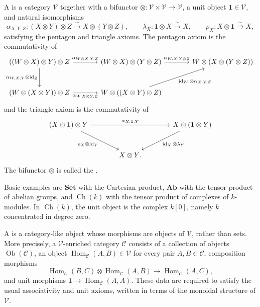 {A  is a category \(\mathcal V\) together with
a bifunctor \(\otimes:\mathcal V\times\mathcal V\to\mathcal V\), a unit
object \(\mathbf 1\in\mathcal V\), and natural isomorphisms
\[
\alpha_{X,Y,Z}:(X\otimes Y)\otimes Z\xrightarrow{\sim}X\otimes(Y\otimes Z),
\qquad
\lambda_X:\mathbf 1\otimes X\xrightarrow{\sim}X,
\qquad
\rho_X:X\otimes\mathbf 1\xrightarrow{\sim}X,
\]
satisfying the pentagon and triangle axioms.  The pentagon axiom is the
commutativity of
\[
\begin{tikzcd}[column sep=large, row sep=large]
{((W\otimes X)\otimes Y)\otimes Z}
    \arrow[r, "\alpha_{W\otimes X,Y,Z}"]
    \arrow[d, "\alpha_{W,X,Y}\otimes \operatorname{id}_Z"']
&
{(W\otimes X)\otimes (Y\otimes Z)}
    \arrow[r, "\alpha_{W,X,Y\otimes Z}"]
&
{W\otimes (X\otimes (Y\otimes Z))}
\\
{(W\otimes (X\otimes Y))\otimes Z}
    \arrow[r, "\alpha_{W,X\otimes Y,Z}"']
&
{W\otimes ((X\otimes Y)\otimes Z)}
    \arrow[ru, "\operatorname{id}_W\otimes \alpha_{X,Y,Z}"']
&
\end{tikzcd}
\]
and the triangle axiom is the commutativity of
\[
\begin{tikzcd}[column sep=large, row sep=large]
{(X\otimes \mathbf 1)\otimes Y}
    \arrow[rr, "\alpha_{X,\mathbf 1,Y}"]
    \arrow[dr, "\rho_X\otimes \operatorname{id}_Y"']
&&
{X\otimes(\mathbf 1\otimes Y)}
    \arrow[dl, "\operatorname{id}_X\otimes \lambda_Y"]
\\
&
{X\otimes Y}.
&
\end{tikzcd}
\]
The bifunctor \(\otimes\) is called the .

Basic examples are \(\mathbf{Set}\) with the Cartesian product,
\(\mathbf{Ab}\) with the tensor product of abelian groups, and
\(\operatorname{Ch}(k)\) with the tensor product of complexes of
\(k\)-modules.  In \(\operatorname{Ch}(k)\), the unit object is the
complex \(k[0]\), namely \(k\) concentrated in degree zero.

A  is a category-like object
whose morphisms are objects of \(\mathcal V\), rather than sets.  More
precisely, a \(\mathcal V\)-enriched category \(\mathcal C\) consists of
a collection of objects \(\operatorname{Ob}(\mathcal C)\), an object
\(\operatorname{Hom}_{\mathcal C}(A,B)\in\mathcal V\) for every pair
\(A,B\in\mathcal C\), composition morphisms
\[
\operatorname{Hom}_{\mathcal C}(B,C)\otimes
\operatorname{Hom}_{\mathcal C}(A,B)
\longrightarrow
\operatorname{Hom}_{\mathcal C}(A,C),
\]
and unit morphisms \(\mathbf 1\to\operatorname{Hom}_{\mathcal C}(A,A)\).
These data are required to satisfy the usual associativity and unit
axioms, written in terms of the monoidal structure of \(\mathcal V\).

}

